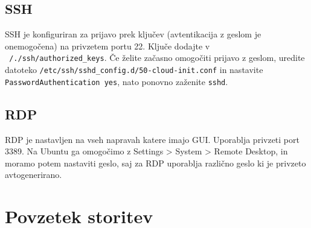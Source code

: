 \documentclass[a4paper,11pt]{article}
\begin{document}
\subsection{SSH}
SSH je konfiguriran za prijavo prek ključev (avtentikacija z geslom je onemogočena) na privzetem portu 22. Ključe dodajte v \texttt{~/./ssh/authorized\_keys}.
Če želite začasno omogočiti prijavo z geslom, uredite datoteko \newline  \verb|/etc/ssh/sshd_config.d/50-cloud-init.conf| in nastavite \texttt{PasswordAuthentication yes}, nato ponovno zaženite \texttt{sshd}.

\subsection{RDP}
RDP je nastavljen na vseh napravah katere imajo GUI. Uporablja privzeti port 3389.
Na Ubuntu ga omogočimo z Settings > System > Remote Desktop, in moramo potem nastaviti geslo, 
saj za RDP uporablja različno geslo ki je privzeto avtogenerirano.

\section{Povzetek storitev}
\end{document}
